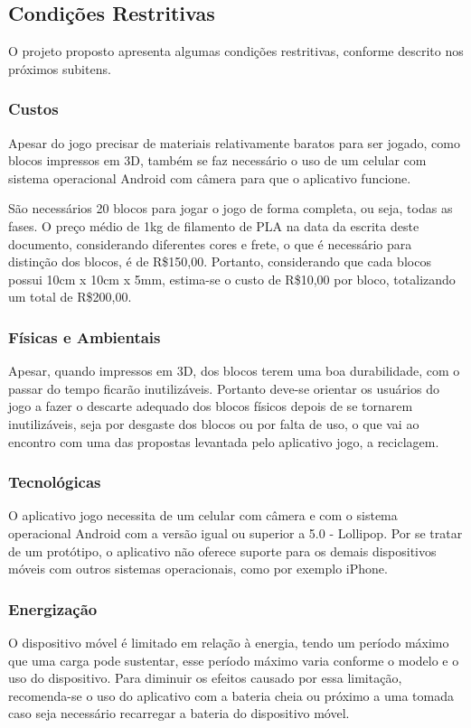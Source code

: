     \subsection{Condições Restritivas}
    O projeto proposto apresenta algumas condições restritivas, conforme descrito nos próximos subitens.

        \subsubsection{Custos}
        Apesar do jogo precisar de materiais relativamente baratos para ser jogado, como blocos impressos em 3D, também se faz necessário o uso de um celular com sistema operacional Android com câmera para que o aplicativo funcione. 
        
        São necessários 20 blocos para jogar o jogo de forma completa, ou seja, todas as fases. O preço médio de 1kg de filamento de PLA na data da escrita deste documento, considerando diferentes cores e frete, o que é necessário para distinção dos blocos, é de R\$150,00. Portanto, considerando que cada blocos possui 10cm x 10cm x 5mm, estima-se o custo de R\$10,00 por bloco, totalizando um total de R\$200,00.
            
        \subsubsection{Físicas e Ambientais}
        Apesar, quando impressos em 3D, dos blocos terem uma boa durabilidade, com o passar do tempo ficarão inutilizáveis. Portanto deve-se orientar os usuários do jogo a fazer o descarte adequado dos blocos físicos depois de se tornarem inutilizáveis, seja por desgaste dos blocos ou por falta de uso, o que vai ao encontro com uma das propostas levantada pelo aplicativo jogo, a reciclagem.
        
        \subsubsection{Tecnológicas}
        O aplicativo jogo necessita de um celular com câmera e com o sistema operacional Android com a versão igual ou superior a 5.0 - Lollipop. Por se tratar de um protótipo, o aplicativo não oferece suporte para os demais dispositivos móveis com outros sistemas operacionais, como por exemplo iPhone. 
        
        \subsubsection{Energização}
        O dispositivo móvel é limitado em relação à energia, tendo um período máximo que uma carga pode sustentar, esse período máximo varia conforme o modelo e o uso do dispositivo. Para diminuir os efeitos causado por essa limitação, recomenda-se o uso do aplicativo com a bateria cheia ou próximo a uma tomada caso seja necessário recarregar a bateria do dispositivo móvel.    
        
